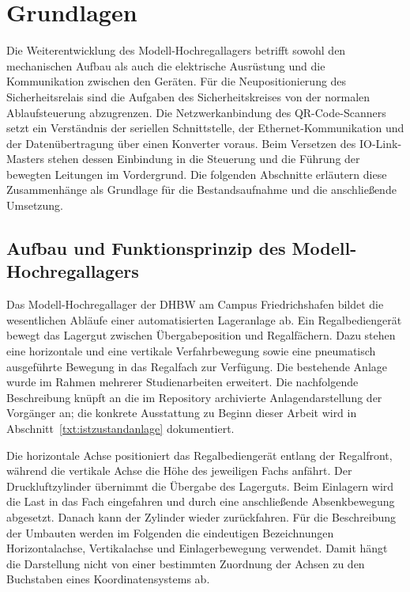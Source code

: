 
\section{Grundlagen}
\label{sec:grundlagen}

Die Weiterentwicklung des Modell-Hochregallagers betrifft sowohl den mechanischen Aufbau als auch die elektrische Ausrüstung und die Kommunikation zwischen den Geräten. Für die Neupositionierung des Sicherheitsrelais sind die Aufgaben des Sicherheitskreises von der normalen Ablaufsteuerung abzugrenzen. Die Netzwerkanbindung des QR-Code-Scanners setzt ein Verständnis der seriellen Schnittstelle, der Ethernet-Kommunikation und der Datenübertragung über einen Konverter voraus. Beim Versetzen des IO-Link-Masters stehen dessen Einbindung in die Steuerung und die Führung der bewegten Leitungen im Vordergrund. Die folgenden Abschnitte erläutern diese Zusammenhänge als Grundlage für die Bestandsaufnahme und die anschließende Umsetzung.

\subsection{Aufbau und Funktionsprinzip des Modell-Hochregallagers}
\label{sec:grundlagen_anlage}

Das Modell-Hochregallager der DHBW am Campus Friedrichshafen bildet die wesentlichen Abläufe einer automatisierten Lageranlage ab. Ein Regalbediengerät bewegt das Lagergut zwischen Übergabeposition und Regalfächern. Dazu stehen eine horizontale und eine vertikale Verfahrbewegung sowie eine pneumatisch ausgeführte Bewegung in das Regalfach zur Verfügung. Die bestehende Anlage wurde im Rahmen mehrerer Studienarbeiten erweitert. Die nachfolgende Beschreibung knüpft an die im Repository archivierte Anlagendarstellung der Vorgänger an; die konkrete Ausstattung zu Beginn dieser Arbeit wird in Abschnitt~\ref{txt:istzustandanlage} dokumentiert. \cite{vorgaenger_grundlagen_archiv}

Die horizontale Achse positioniert das Regalbediengerät entlang der Regalfront, während die vertikale Achse die Höhe des jeweiligen Fachs anfährt. Der Druckluftzylinder übernimmt die Übergabe des Lagerguts. Beim Einlagern wird die Last in das Fach eingefahren und durch eine anschließende Absenkbewegung abgesetzt. Danach kann der Zylinder wieder zurückfahren. Für die Beschreibung der Umbauten werden im Folgenden die eindeutigen Bezeichnungen Horizontalachse, Vertikalachse und Einlagerbewegung verwendet. Damit hängt die Darstellung nicht von einer bestimmten Zuordnung der Achsen zu den Buchstaben eines Koordinatensystems ab. \cite{vorgaenger_grundlagen_archiv}


